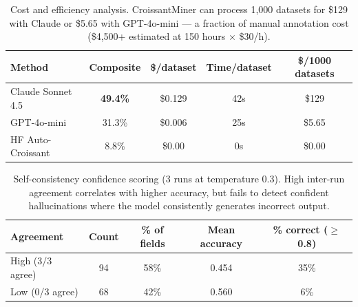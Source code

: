 \begin{table}[t]
\centering
\caption{Cost and efficiency analysis. CroissantMiner can process 1,000 datasets for \$129 with Claude or \$5.65 with GPT-4o-mini --- a fraction of manual annotation cost (\$4,500+ estimated at 150 hours $\times$ \$30/h).}
\label{tab:cost}
\begin{tabular}{lcccc}
\toprule
Method & Composite & \$/dataset & Time/dataset & \$/1000 datasets \\
\midrule
Claude Sonnet 4.5 & \textbf{49.4\%} & \$0.129 & 42s & \$129 \\
GPT-4o-mini & 31.3\% & \$0.006 & 25s & \$5.65 \\
HF Auto-Croissant & 8.8\% & \$0.00 & 0s & \$0.00 \\
\bottomrule
\end{tabular}
\end{table}



\begin{table}[t]
\centering
\caption{Self-consistency confidence scoring (3 runs at temperature 0.3). High inter-run agreement correlates with higher accuracy, but fails to detect confident hallucinations where the model consistently generates incorrect output.}
\label{tab:confidence}
\begin{tabular}{lcccc}
\toprule
Agreement & Count & \% of fields & Mean accuracy & \% correct ($\geq$0.8) \\
\midrule
High (3/3 agree) & 94 & 58\% & 0.454 & 35\% \\
Low (0/3 agree) & 68 & 42\% & 0.560 & 6\% \\
\bottomrule
\end{tabular}
\end{table}



